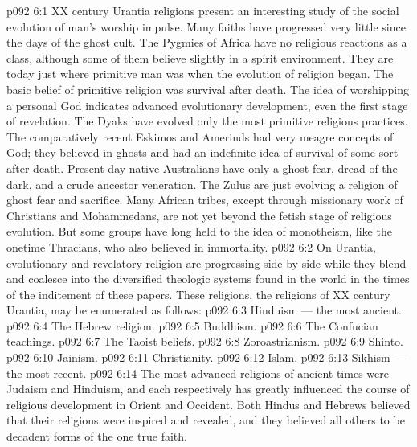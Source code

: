 \vs p092 6:1 XX century Urantia religions present an interesting study of the social evolution of man’s worship impulse. Many faiths have progressed very little since the days of the ghost cult. The Pygmies of Africa have no religious reactions as a class, although some of them believe slightly in a spirit environment. They are today just where primitive man was when the evolution of religion began. The basic belief of primitive religion was survival after death. The idea of worshipping a personal God indicates advanced evolutionary development, even the first stage of revelation. The Dyaks have evolved only the most primitive religious practices. The comparatively recent Eskimos and Amerinds had very meagre concepts of God; they believed in ghosts and had an indefinite idea of survival of some sort after death. Present\hyp{}day native Australians have only a ghost fear, dread of the dark, and a crude ancestor veneration. The Zulus are just evolving a religion of ghost fear and sacrifice. Many African tribes, except through missionary work of Christians and Mohammedans, are not yet beyond the fetish stage of religious evolution. But some groups have long held to the idea of monotheism, like the onetime Thracians, who also believed in immortality.
\vs p092 6:2 \pc On Urantia, evolutionary and revelatory religion are progressing side by side while they blend and coalesce into the diversified theologic systems found in the world in the times of the inditement of these papers. These religions, the religions of XX century Urantia, may be enumerated as follows:
\vs p092 6:3 \bibnobreakspace Hinduism --- the most ancient.
\vs p092 6:4 \bibnobreakspace The Hebrew religion.
\vs p092 6:5 \bibnobreakspace Buddhism.
\vs p092 6:6 \bibnobreakspace The Confucian teachings.
\vs p092 6:7 \bibnobreakspace The Taoist beliefs.
\vs p092 6:8 \bibnobreakspace Zoroastrianism.
\vs p092 6:9 \bibnobreakspace Shinto.
\vs p092 6:10 \bibnobreakspace Jainism.
\vs p092 6:11 \bibnobreakspace Christianity.
\vs p092 6:12 \bibnobreakspace Islam.
\vs p092 6:13 \bibnobreakspace Sikhism --- the most recent.
\vs p092 6:14 \pc The most advanced religions of ancient times were Judaism and Hinduism, and each respectively has greatly influenced the course of religious development in Orient and Occident. Both Hindus and Hebrews believed that their religions were inspired and revealed, and they believed all others to be decadent forms of the one true faith.
